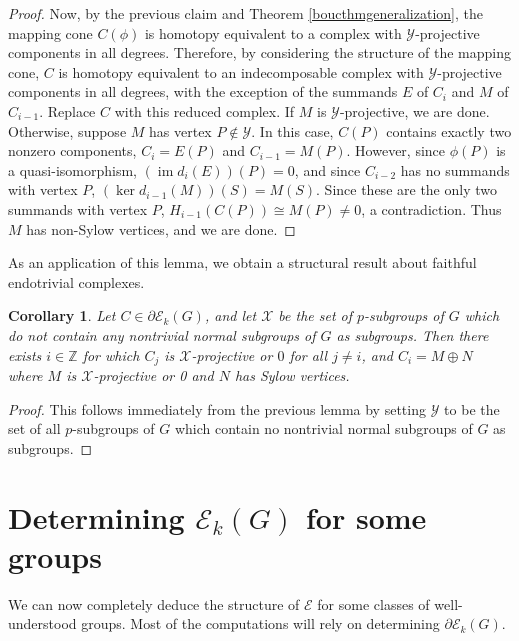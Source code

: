 \documentclass[10pt,letterpaper, boxed, cm]{amsart}
\newcommand{\Z}{\mathbb{Z}}
\newcommand{\im}{\operatorname{im}}
\newcommand{\calE}{\mathcal{E}}
\newcommand{\calX}{\mathcal{X}}
\newcommand{\calY}{\mathcal{Y}}
\newtheorem{corollary}[theorem]{Corollary}
\theoremstyle{remark}
\theoremstyle{definition}
\begin{document}
\begin{proof}
		Now, by the previous claim and Theorem \ref{boucthmgeneralization}, the mapping cone $C(\phi)$ is homotopy equivalent to a complex with $\calY$-projective components in all degrees. Therefore, by considering the structure of the mapping cone, $C$ is homotopy equivalent to an indecomposable complex with $\calY$-projective components in all degrees, with the exception of the summands $E$ of $C_i$ and $M$ of $C_{i-1}$. Replace $C$ with this reduced complex. If $M$ is $\calY$-projective, we are done. Otherwise, suppose $M$ has vertex $P \not\in \calY$. In this case, $C(P)$ contains exactly two nonzero components, $C_i = E(P)$ and $C_{i-1} = M(P)$. However, since $\phi(P)$ is a quasi-isomorphism, $(\im d_i(E))(P) = 0$, and since $C_{i-2}$ has no summands with vertex $P$, $(\ker d_{i-1}(M))(S) = M(S)$. Since these are the only two summands with vertex $P$, $H_{i-1}(C(P)) \cong M(P) \neq 0$, a contradiction. Thus $M$ has non-Sylow vertices, and we are done.
	\end{proof}

	As an application of this lemma, we obtain a structural result about faithful endotrivial complexes.

	\begin{corollary}
		Let $C \in \partial\calE_k(G)$, and let $\calX$ be the set of $p$-subgroups of $G$ which do not contain any nontrivial normal subgroups of $G$ as subgroups. Then there exists $i \in \Z$ for which $C_j$ is $\calX$-projective or $0$ for all $j \neq i$, and $C_i = M \oplus N$ where $M$ is $\calX$-projective or 0 and $N$ has Sylow vertices.
	\end{corollary}
    \begin{proof}
        This follows immediately from the previous lemma by setting $\calY$ to be the set of all $p$-subgroups of $G$ which contain no nontrivial normal subgroups of $G$ as subgroups.
    \end{proof}

	\section{Determining $\calE_k(G)$ for some groups} \label{section5}

	We can now completely deduce the structure of $\calE$ for some classes of well-understood groups. Most of the computations will rely on determining $\partial\calE_k(G)$.
\end{document}
